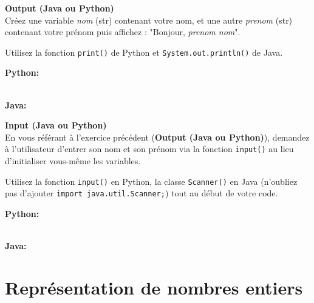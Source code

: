 \begin{Exercice}[5 minutes] \textbf{Output (Java ou Python)}\\
   Créez une variable \textit{nom} (str) contenant votre nom, et une autre \textit{prenom} (str) contenant votre prénom puis affichez : "Bonjour, \textit{prenom nom}". \\
   
    \begin{conseil}
        Utilisez la fonction \lstinline{print()} de Python et \lstinline{System.out.println()} de Java. 
        
    \end{conseil}
    \begin{solution}
    
    \textbf{Python:} 
    
    
    \textbf{\\Java:} 
      
    \end{solution}   
\end{Exercice}

\begin{Exercice}[5 minutes] \textbf{Input (Java ou Python)}\\
   En vous référant à l'exercice précédent (\textbf{Output (Java ou Python)}), demandez à l'utilisateur d'entrer son nom et son prénom via la fonction \lstinline{input()} au lieu d'initialiser vous-même les variables. \\
   
    \begin{conseil}
       Utilisez la fonction \lstinline{input()} en Python, la classe \lstinline{Scanner()} en Java (n'oubliez pas d'ajouter \lstinline{import java.util.Scanner;}) tout au début de votre code. 
        
    \end{conseil}
    \begin{solution}
    
    \textbf{Python:} 
    
    
    \textbf{\\Java:}
      
       
        
    \end{solution}   
\end{Exercice}


\section{Représentation de nombres entiers}

